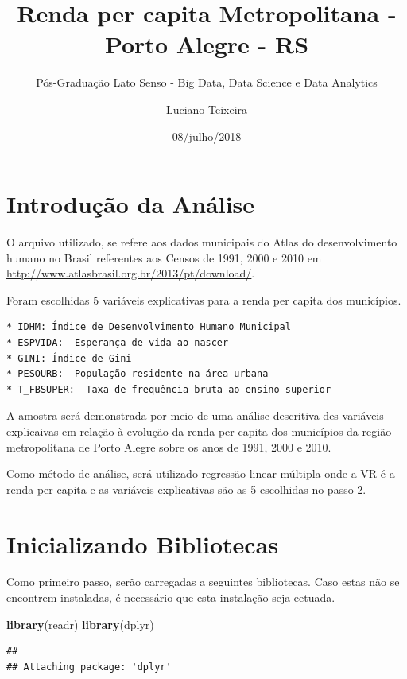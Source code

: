 \documentclass[]{article}
\title{Renda per capita Metropolitana - Porto Alegre - RS}
\subtitle{Pós-Graduação Lato Senso - Big Data, Data Science e Data Analytics}
\author{Luciano Teixeira}
\date{08/julho/2018}
\newenvironment{Shaded}{\begin{snugshade}}{\end{snugshade}}
\newcommand{\KeywordTok}[1]{\textcolor[rgb]{0.13,0.29,0.53}{\textbf{#1}}}
\newcommand{\NormalTok}[1]{#1}
\begin{document}
\maketitle

{
\setcounter{tocdepth}{2}
\tableofcontents
}
\section{Introdução da Análise}\label{introducao-da-analise}

O arquivo utilizado, se refere aos dados municipais do Atlas do
desenvolvimento humano no Brasil referentes aos Censos de 1991, 2000 e
2010 em \url{http://www.atlasbrasil.org.br/2013/pt/download/}.

Foram escolhidas 5 variáveis explicativas para a renda per capita dos
municípios.

\begin{verbatim}
* IDHM: Índice de Desenvolvimento Humano Municipal
* ESPVIDA:  Esperança de vida ao nascer
* GINI: Índice de Gini
* PESOURB:  População residente na área urbana
* T_FBSUPER:  Taxa de frequência bruta ao ensino superior
\end{verbatim}

A amostra será demonstrada por meio de uma análise descritiva des
variáveis explicaivas em relação à evolução da renda per capita dos
municípios da região metropolitana de Porto Alegre sobre os anos de
1991, 2000 e 2010.

Como método de análise, será utilizado regressão linear múltipla onde a
VR é a renda per capita e as variáveis explicativas são as 5 escolhidas
no passo 2.

\section{Inicializando Bibliotecas}\label{inicializando-bibliotecas}

Como primeiro passo, serão carregadas a seguintes bibliotecas. Caso
estas não se encontrem instaladas, é necessário que esta instalação seja
eetuada.

\begin{Shaded}
\begin{Highlighting}[]
\KeywordTok{library}\NormalTok{(readr)}
\KeywordTok{library}\NormalTok{(dplyr)}
\end{Highlighting}
\end{Shaded}

\begin{verbatim}
## 
## Attaching package: 'dplyr'
\end{verbatim}
\end{document}
